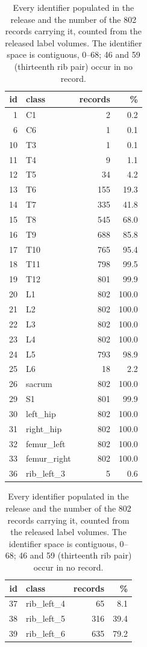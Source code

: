 \begin{table}[p]
\caption{\label{tab:census}Every identifier populated in the release and the
number of the 802 records carrying it, counted from the released label volumes.
The identifier space is contiguous, 0--68; 46 and 59 (thirteenth rib pair) occur in no record.}
\centering\small
\begin{tabular}{@{}rlrr@{}}
\toprule
id & class & records & \% \\
\midrule
1 & C1 & 2 & 0.2 \\
6 & C6 & 1 & 0.1 \\
10 & T3 & 1 & 0.1 \\
11 & T4 & 9 & 1.1 \\
12 & T5 & 34 & 4.2 \\
13 & T6 & 155 & 19.3 \\
14 & T7 & 335 & 41.8 \\
15 & T8 & 545 & 68.0 \\
16 & T9 & 688 & 85.8 \\
17 & T10 & 765 & 95.4 \\
18 & T11 & 798 & 99.5 \\
19 & T12 & 801 & 99.9 \\
20 & L1 & 802 & 100.0 \\
21 & L2 & 802 & 100.0 \\
22 & L3 & 802 & 100.0 \\
23 & L4 & 802 & 100.0 \\
24 & L5 & 793 & 98.9 \\
25 & L6 & 18 & 2.2 \\
26 & sacrum & 802 & 100.0 \\
29 & S1 & 801 & 99.9 \\
30 & left\_hip & 802 & 100.0 \\
31 & right\_hip & 802 & 100.0 \\
32 & femur\_left & 802 & 100.0 \\
33 & femur\_right & 802 & 100.0 \\
36 & rib\_left\_3 & 5 & 0.6 \\
\bottomrule
\end{tabular}
\hspace{2em}
\begin{tabular}{@{}rlrr@{}}
\toprule
id & class & records & \% \\
\midrule
37 & rib\_left\_4 & 65 & 8.1 \\
38 & rib\_left\_5 & 316 & 39.4 \\
39 & rib\_left\_6 & 635 & 79.2 \\

\end{tabular}
\end{table}

